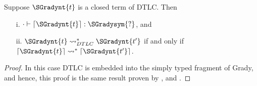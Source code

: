 \begin{lemma}
  \label{lemma:inclusion_of_dtlc}
  Suppose $\SGradynt{t}$ is a closed term of DTLC. Then
  \begin{itemize}
  \item[i.] $  \cdot   \vdash   \lceil  \SGradynt{t}  \rceil   :  \SGradysym{\mbox{?}} $, and
  \item[ii.] $ \SGradynt{t}  \rightsquigarrow^*_{DTLC}  \SGradynt{t'} $ if and only if $  \lceil  \SGradynt{t}  \rceil   \rightsquigarrow^*   \lceil  \SGradynt{t'}  \rceil  $.
  \end{itemize}
\end{lemma}
\begin{proof}
  In this case DTLC is embedded into the simply typed fragment of
  Grady, and hence, this proof is the same result proven by \cite{Siek:2006}, and \cite{Siek:2015}.
\end{proof}
